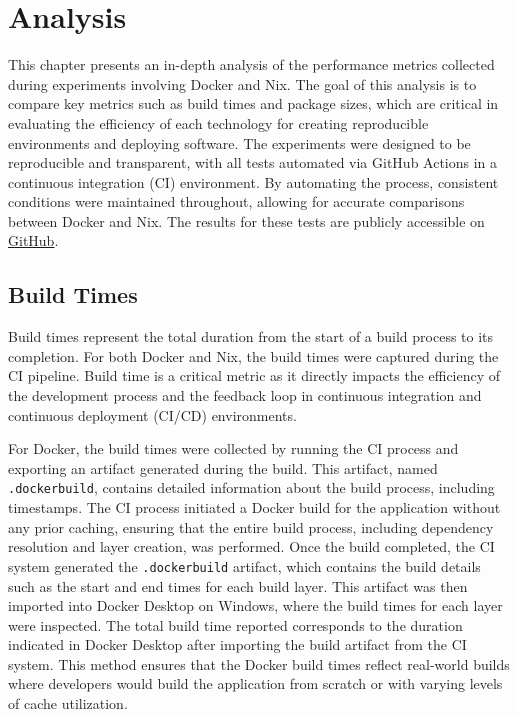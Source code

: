 \chapter{Analysis}
This chapter presents an in-depth analysis of the performance metrics collected during
experiments involving Docker and Nix. The goal of this analysis is to compare key metrics
such as build times and package sizes, which are critical in evaluating the efficiency of
each technology for creating reproducible environments and deploying software.
The experiments were designed to be reproducible and transparent, with all tests automated
via GitHub Actions in a continuous integration (CI) environment. By automating the process,
consistent conditions were maintained throughout, allowing for accurate comparisons between
Docker and Nix. The results for these tests are publicly accessible on \href{https://github.com/clemenscodes/webserver/actions}{GitHub}.

\section{Build Times}
Build times represent the total duration from the start of a build process to its completion.
For both Docker and Nix, the build times were captured during the CI pipeline. Build time is
a critical metric as it directly impacts the efficiency of the development process and the
feedback loop in continuous integration and continuous deployment (CI/CD) environments.

For Docker, the build times were collected by running the CI process and exporting an artifact
generated during the build. This artifact, named \texttt{.dockerbuild}, contains detailed
information about the build process, including timestamps. The CI process initiated a Docker
build for the application without any prior caching, ensuring that the entire build process,
including dependency resolution and layer creation, was performed. Once the build completed,
the CI system generated the \texttt{.dockerbuild} artifact, which contains the build details
such as the start and end times for each build layer. This artifact was then imported into
Docker Desktop on Windows, where the build times for each layer were inspected. The total
build time reported corresponds to the duration indicated in Docker Desktop after importing
the build artifact from the CI system. This method ensures that the Docker build times reflect
real-world builds where developers would build the application from scratch or with varying
levels of cache utilization.

